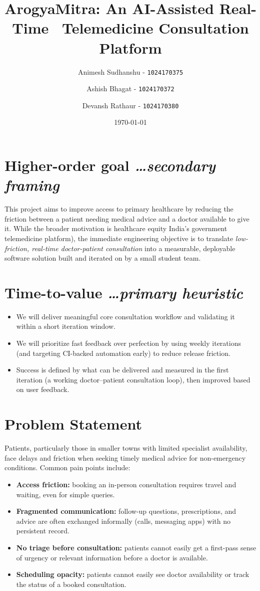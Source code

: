 \documentclass[11pt,a4paper]{article}
\title{ArogyaMitra: An AI-Assisted Real-Time \ Telemedicine Consultation Platform}
\author{
Animesh Sudhanshu -
{ \texttt{1024170375}}
\and
Ashish Bhagat -
{\texttt{1024170372}}
\and
Devansh Rathaur - 
{\texttt{1024170380}}
}
\date{\today}
\newcommand{\BvrHint}[1]{%
{\normalfont\normalsize\itshape\hfill #1}}
\begin{document}
\maketitle

\section{Higher-order goal%
\BvrHint{\ldots secondary framing}}
This project aims to improve access to primary
healthcare by reducing the friction between a patient
needing medical advice and a doctor available to give
it. While the broader motivation is healthcare equity
India's government telemedicine platform), the
immediate engineering objective is to translate
\emph{low-friction, real-time doctor-patient
consultation} into a measurable, deployable software
solution built and iterated on by a small student team.

\section{Time-to-value %
\BvrHint{\ldots primary heuristic}}
\begin{itemize}[leftmargin=0.7cm]
\item We will deliver meaningful  core consultation workflow and validating it within a short iteration window.
\item We will prioritize fast feedback over perfection by using weekly iterations (and targeting CI-backed automation early) to reduce release friction.
\item Success is defined by what can be delivered and measured in the first iteration (a working doctor--patient consultation loop), then improved based on user feedback.
\end{itemize}

\section{Problem Statement}
Patients, particularly those in smaller towns with
limited specialist availability, face delays and
friction when seeking timely medical advice for
non-emergency conditions. Common pain points include:
\begin{itemize}[leftmargin=0.7cm]
\item \textbf{Access friction:} booking an in-person consultation requires travel and waiting, even for simple queries.
\item \textbf{Fragmented communication:} follow-up questions, prescriptions, and advice are often exchanged informally (calls, messaging apps) with no persistent record.
\item \textbf{No triage before consultation:} patients cannot easily get a first-pass sense of urgency or relevant information before a doctor is available.
\item \textbf{Scheduling opacity:} patients cannot easily see doctor availability or track the status of a booked consultation.
\end{itemize}
\end{document}
